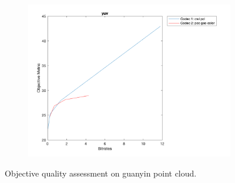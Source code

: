 \documentclass{article}
\begin{document}
\begin{figure}
    \begin{subfigure}[b]{0.65\textwidth}
    \includegraphics[width=\textwidth]{Figures/task2/guanyin_yuv.png}
    \end{subfigure}
    \caption{Objective quality assessment on \textsf{guanyin} point cloud.}
    \label{fig:obj_guanyin}
\end{figure}
\end{document}

